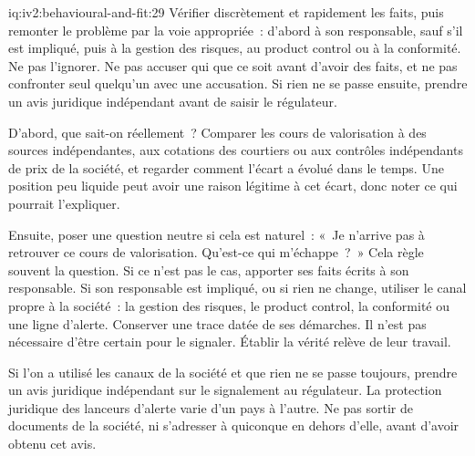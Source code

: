 \begin{solution}{iq:iv2:behavioural-and-fit:29}
Vérifier discrètement et rapidement les faits, puis remonter le problème par la voie appropriée~: d'abord à son responsable, sauf s'il est impliqué, puis à la gestion des risques, au product control ou à la conformité. Ne pas l'ignorer. Ne pas accuser qui que ce soit avant d'avoir des faits, et ne pas confronter seul quelqu'un avec une accusation. Si rien ne se passe ensuite, prendre un avis juridique indépendant avant de saisir le régulateur.

D'abord, que sait-on réellement~? Comparer les cours de valorisation à des sources indépendantes, aux cotations des courtiers ou aux contrôles indépendants de prix de la société, et regarder comment l'écart a évolué dans le temps. Une position peu liquide peut avoir une raison légitime à cet écart, donc noter ce qui pourrait l'expliquer.

Ensuite, poser une question neutre si cela est naturel~: «~Je n'arrive pas à retrouver ce cours de valorisation. Qu'est-ce qui m'échappe~?~» Cela règle souvent la question. Si ce n'est pas le cas, apporter ses faits écrits à son responsable. Si son responsable est impliqué, ou si rien ne change, utiliser le canal propre à la société~: la gestion des risques, le product control, la conformité ou une ligne d'alerte. Conserver une trace datée de ses démarches. Il n'est pas nécessaire d'être certain pour le signaler. Établir la vérité relève de leur travail.

Si l'on a utilisé les canaux de la société et que rien ne se passe toujours, prendre un avis juridique indépendant sur le signalement au régulateur. La protection juridique des lanceurs d'alerte varie d'un pays à l'autre. Ne pas sortir de documents de la société, ni s'adresser à quiconque en dehors d'elle, avant d'avoir obtenu cet avis.

\end{solution}

